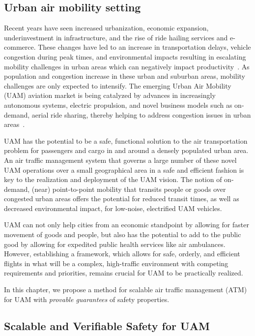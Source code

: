 
\subsection{Urban air mobility setting}
Recent years have seen increased urbanization, economic expansion, underinvestment in infrastructure, and the rise of ride hailing services and e-commerce.  These changes have led to an increase in transportation delays, vehicle congestion during peak times, and environmental impacts resulting in escalating mobility challenges in urban areas which can negatively impact productivity~\cite{harriet2013assessment}. As population and congestion increase in these urban and suburban areas, mobility challenges are only expected to intensify. The emerging Urban Air Mobility (UAM) aviation market is being catalyzed by advances in increasingly autonomous systems, electric propulsion, and novel business models such as on-demand, aerial ride sharing, thereby helping to address congestion issues in urban areas~\cite{flightplan2030}.  

UAM has the potential to be a safe, functional solution to the air transportation problem for passengers and cargo in and around a densely populated urban area.  An air traffic management system that governs a large number of these novel UAM operations over a small geographical area in a safe and efficient fashion is key to the realization and deployment of the UAM vision.  The notion of on-demand, (near) point-to-point mobility that transits people or goods over congested urban areas offers the potential for reduced transit times, as well as decreased environmental impact, for low-noise, electrified UAM vehicles.  

UAM can not only help cities from an economic standpoint by allowing for faster movement of goods and people, but also has the potential to add to the public good by allowing for expedited public health services like air ambulances. However, establishing a framework, which allows for safe, orderly, and efficient flights in what will be a complex, high-traffic environment with competing requirements and priorities, remains crucial for UAM to be practically realized. 

In this chapter, we propose a method for scalable air traffic management (ATM) for UAM with \emph{provable guarantees} of safety properties. 


\subsection{Scalable and Verifiable Safety for UAM}


